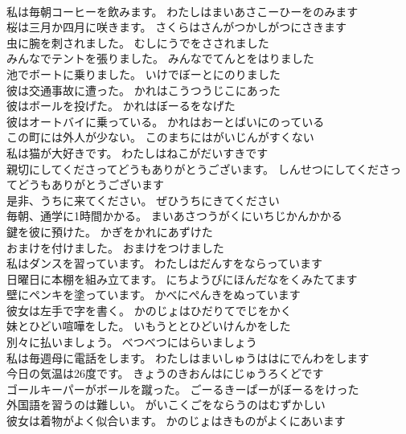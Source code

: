 \documentclass[8pt]{extreport}
\begin{document}
\begin{CJK}{UTF8}{min}
\\	私は毎朝コーヒーを飲みます。	わたしはまいあさこーひーをのみます 
\\	桜は三月か四月に咲きます。	さくらはさんがつかしがつにさきます 
\\	虫に腕を刺されました。	むしにうでをさされました 
\\	みんなでテントを張りました。	みんなでてんとをはりました 
\\	池でボートに乗りました。	いけでぼーとにのりました 
\\	彼は交通事故に遭った。	かれはこうつうじこにあった 
\\	彼はボールを投げた。	かれはぼーるをなげた 
\\	彼はオートバイに乗っている。	かれはおーとばいにのっている 
\\	この町には外人が少ない。	このまちにはがいじんがすくない 
\\	私は猫が大好きです。	わたしはねこがだいすきです 
\\	親切にしてくださってどうもありがとうございます。	しんせつにしてくださってどうもありがとうございます 
\\	是非、うちに来てください。	ぜひうちにきてください 
\\	毎朝、通学に1時間かかる。	まいあさつうがくにいちじかんかかる 
\\	鍵を彼に預けた。	かぎをかれにあずけた 
\\	おまけを付けました。	おまけをつけました 
\\	私はダンスを習っています。	わたしはだんすをならっています 
\\	日曜日に本棚を組み立てます。	にちようびにほんだなをくみたてます 
\\	壁にペンキを塗っています。	かべにぺんきをぬっています 
\\	彼女は左手で字を書く。	かのじょはひだりてでじをかく 
\\	妹とひどい喧嘩をした。	いもうととひどいけんかをした 
\\	別々に払いましょう。	べつべつにはらいましょう 
\\	私は毎週母に電話をします。	わたしはまいしゅうははにでんわをします 
\\	今日の気温は26度です。	きょうのきおんはにじゅうろくどです 
\\	ゴールキーパーがボールを蹴った。	ごーるきーぱーがぼーるをけった 
\\	外国語を習うのは難しい。	がいこくごをならうのはむずかしい 
\\	彼女は着物がよく似合います。	かのじょはきものがよくにあいます 

\end{CJK}
\end{document}
